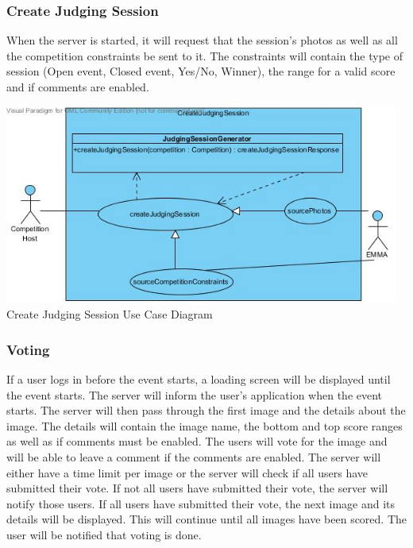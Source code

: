 \documentclass[10pt,a4paper]{article}
\begin{document}
\subsubsection{Create Judging Session}
When the server is started, it will request that the session's photos as well as all the competition constraints be sent to it. The constraints will contain the type of session (Open event, Closed event, Yes/No, Winner), the range for a valid score and if comments are enabled.

\begin{center}
\advance\leftskip-1.3cm
\includegraphics[width=130mm]{Pictures/CreateJudgingSession.jpg} 
Create Judging Session Use Case Diagram 
\end{center}

\subsubsection{Voting}
If a user logs in before the event starts, a loading screen will be displayed until the event starts. The server will inform the user's application when the event starts. The server will then pass through the first image and the details about the image. The details will contain the image name, the bottom and top score ranges as well as if comments must be enabled. The users will vote for the image and will be able to leave a comment if the comments are enabled. The server will either have a time limit per image or the server will check if all users have submitted their vote. If not all users have submitted their vote, the server will notify those users. If all users have submitted their vote, the next image and its details will be displayed. This will continue until all images have been scored. The user will be notified that voting is done.
\end{document}
